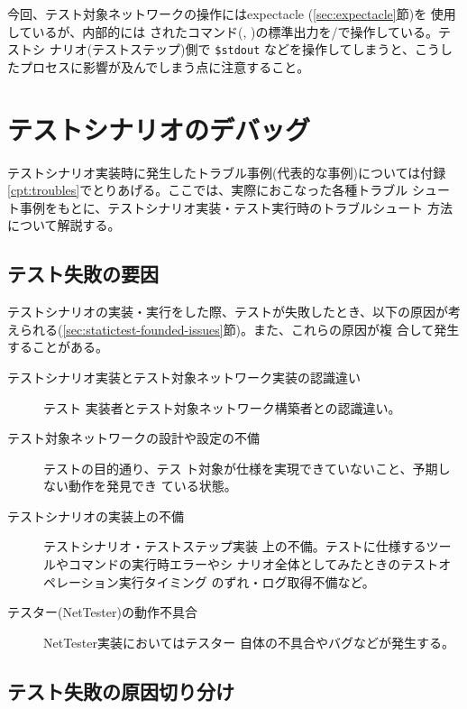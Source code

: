 今回、テスト対象ネットワークの操作にはexpectacle (\ref{sec:expectacle}節)を
使用しているが、内部的には  されたコマンド(,
)の標準出力を/で操作している。テストシ
ナリオ(テストステップ)側で \verb|$stdout| などを操作してしまうと、こうし
たプロセスに影響が及んでしまう点に注意すること。

 \section{テストシナリオのデバッグ}
 \label{sec:debugging-test-scenario}
 テストシナリオ実装時に発生したトラブル事例(代表的な事例)については付録
\ref{cpt:troubles}でとりあげる。ここでは、実際におこなった各種トラブル
シュート事例をもとに、テストシナリオ実装・テスト実行時のトラブルシュート
方法について解説する。

  \subsection{テスト失敗の要因}
テストシナリオの実装・実行をした際、テストが失敗したとき、以下の原因が考
えられる(\ref{sec:statictest-founded-issues}節)。また、これらの原因が複
合して発生することがある。
\begin{description}
 \item[テストシナリオ実装とテスト対象ネットワーク実装の認識違い] テスト
            実装者とテスト対象ネットワーク構築者との認識違い。
 \item[テスト対象ネットワークの設計や設定の不備] テストの目的通り、テス
            ト対象が仕様を実現できていないこと、予期しない動作を発見でき
            ている状態。
 \item[テストシナリオの実装上の不備] テストシナリオ・テストステップ実装
            上の不備。テストに仕様するツールやコマンドの実行時エラーやシ
            ナリオ全体としてみたときのテストオペレーション実行タイミング
            のずれ・ログ取得不備など。
 \item[テスター(NetTester)の動作不具合] NetTester実装においてはテスター
            自体の不具合やバグなどが発生する。
\end{description}

  \subsection{テスト失敗の原因切り分け}

